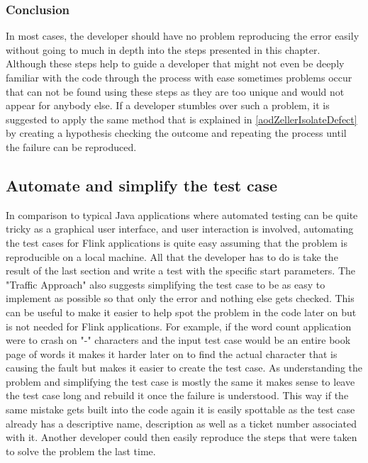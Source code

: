 \subsubsection{Conclusion}
In most cases, the developer should have no problem reproducing the error easily without going to much in depth into the steps presented in this chapter. Although these steps help to guide a developer that might not even be deeply familiar with the code through the process with ease sometimes problems occur that can not be found using these steps as they are too unique and would not appear for anybody else. If a developer stumbles over such a problem, it is suggested to apply the same method that is explained in \ref{aodZellerIsolateDefect} by creating a hypothesis checking the outcome and repeating the process until the failure can be reproduced.

\subsection{Automate and simplify the test case}
In comparison to typical Java applications where automated testing can be quite tricky as a graphical user interface, and user interaction is involved, automating the test cases for Flink applications is quite easy assuming that the problem is reproducible on a local machine. All that the developer has to do is take the result of the last section and write a test with the specific start parameters. The "Traffic Approach" also suggests simplifying the test case to be as easy to implement as possible so that only the error and nothing else gets checked. This can be useful to make it easier to help spot the problem in the code later on but is not needed for Flink applications. For example, if the word count application were to crash on "-" characters and the input test case would be an entire book page of words it makes it harder later on to find the actual character that is causing the fault but makes it easier to create the test case. As understanding the problem and simplifying the test case is mostly the same it makes sense to leave the test case long and rebuild it once the failure is understood. This way if the same mistake gets built into the code again it is easily spottable as the test case already has a descriptive name, description as well as a ticket number associated with it. Another developer could then easily reproduce the steps that were taken to solve the problem the last time.

